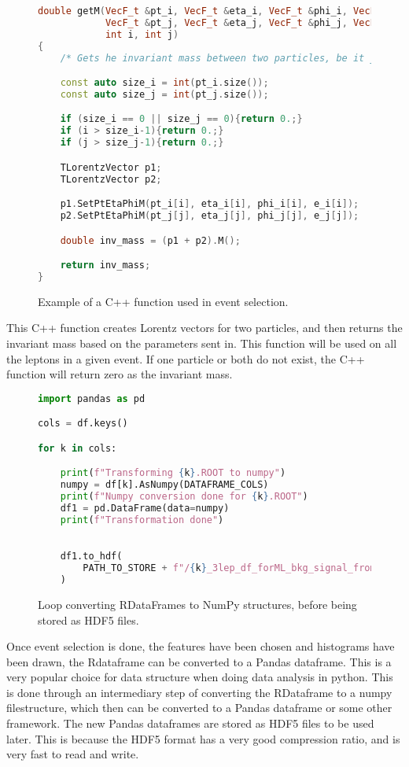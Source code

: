 \begin{figure}[H]
    \centering
\begin{lstlisting}[language=C++, style=cppstyle, label={code:cpp_func_example}]
double getM(VecF_t &pt_i, VecF_t &eta_i, VecF_t &phi_i, VecF_t &e_i,
            VecF_t &pt_j, VecF_t &eta_j, VecF_t &phi_j, VecF_t &e_j,
            int i, int j)
{
    /* Gets he invariant mass between two particles, be it jets or leptons */

    const auto size_i = int(pt_i.size());
    const auto size_j = int(pt_j.size());

    if (size_i == 0 || size_j == 0){return 0.;}
    if (i > size_i-1){return 0.;}
    if (j > size_j-1){return 0.;}

    TLorentzVector p1;
    TLorentzVector p2;

    p1.SetPtEtaPhiM(pt_i[i], eta_i[i], phi_i[i], e_i[i]);
    p2.SetPtEtaPhiM(pt_j[j], eta_j[j], phi_j[j], e_j[j]);

    double inv_mass = (p1 + p2).M();

    return inv_mass;
}
\end{lstlisting}
\caption[C++ function example]{Example of a C++ function used in event selection.}
\end{figure}
This C++ function creates Lorentz vectors for two particles, and then returns the invariant mass based on the parameters sent in. 
This function will be used on all the leptons in a given event. If one particle or both do not exist, the C++ function will
return zero as the invariant mass. \par

\begin{figure}[H]
    \centering
\begin{lstlisting}[language=Python, style=pythonstyle, label={code:python_func_example_2}]
import pandas as pd 

cols = df.keys()

for k in cols:

    print(f"Transforming {k}.ROOT to numpy")
    numpy = df[k].AsNumpy(DATAFRAME_COLS)
    print(f"Numpy conversion done for {k}.ROOT")
    df1 = pd.DataFrame(data=numpy)
    print(f"Transformation done")
    

    df1.to_hdf(
        PATH_TO_STORE + f"/{k}_3lep_df_forML_bkg_signal_fromRDF.hdf5", "mini"
    )

\end{lstlisting}
\caption[Conversion from RDataFrame to NumPy]{Loop converting RDataFrames to NumPy structures, before being stored as HDF5 files.}
\end{figure}
Once event selection is done, the features have been chosen and histograms have been 
drawn, the Rdataframe can be converted to a Pandas dataframe. This is a very popular 
choice for data structure when doing data analysis in python. This is done through an 
intermediary step of converting the RDataframe to a numpy filestructure, which then can 
be converted to a Pandas\cite{reback2020pandas} dataframe or some other framework.
The new Pandas dataframes are stored as HDF5\cite{hdf5} files to be used later. This is 
because the HDF5 format has a very good compression ratio, and is very fast to read and write. 